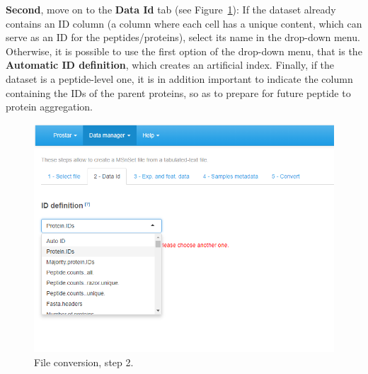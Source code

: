 \documentclass[12pt]{article}
\begin{document}
\textbf{Second}, move on to the \textbf{Data Id} tab (see Figure~\ref{fig:imp2}): If the dataset already contains an ID column (a column where each cell has a unique content, which can serve as an ID for the peptides/proteins), select its name in the drop-down menu. Otherwise, it is possible to use the first option of the drop-down menu, that is the \textbf{Automatic ID definition}, which creates an artificial index. Finally, if the dataset is a peptide-level one, it is in addition important to indicate the column containing the IDs of the parent proteins, so as to prepare for future peptide to protein aggregation. 

\begin {figure}
\includegraphics[width=\textwidth]{images/convert_dataID.png}
\caption{File conversion, step 2.}\label{fig:imp2}
\end {figure}
\end{document}
